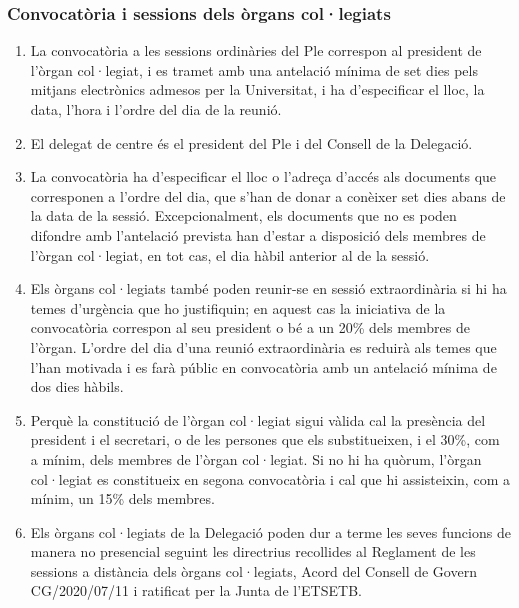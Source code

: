 \documentclass[a4paper,12pt]{article}
\renewcommand*{\thesubsubsection}{\arabic{subsubsection}}
\begin{document}
\subsubsection{Convocatòria i sessions dels òrgans col·legiats}\label{art:convocatories}
\begin{enumerate}[\thesubsubsection.1]
	\item La convocatòria a les sessions ordinàries del Ple correspon al president de l'òrgan col·legiat, i es tramet amb una antelació mínima de set dies pels mitjans electrònics admesos per la Universitat, i ha d'especificar el lloc, la data, l'hora i l'ordre del dia de la reunió.
	\item El delegat de centre és el president del Ple i del Consell de la Delegació.
	\item La convocatòria ha d'especificar el lloc o l'adreça d'accés als documents que corresponen a l'ordre del dia, que s'han de donar a conèixer set dies abans de la data de la sessió. Excepcionalment, els documents que no es poden difondre amb l'antelació prevista han d'estar a disposició dels membres de l'òrgan col·legiat, en tot cas, el dia hàbil anterior al de la sessió.
	\item Els òrgans col·legiats també poden reunir-se en sessió extraordinària si hi ha temes d'urgència que ho justifiquin; en aquest cas la iniciativa de la convocatòria correspon al seu president o bé a un 20\% dels membres de l'òrgan.\label{art:extraordinaries}
	L'ordre del dia d'una reunió extraordinària es reduirà als temes que l'han motivada i es farà públic en convocatòria amb un antelació mínima de dos dies hàbils.
	\item Perquè la constitució de l'òrgan col·legiat sigui vàlida cal la presència del president i el secretari, o de les persones que els substitueixen, i el 30\%, com a mínim, dels membres de l'òrgan col·legiat. Si no hi ha quòrum, l'òrgan col·legiat es constitueix en segona convocatòria i cal que hi assisteixin, com a mínim, un 15\% dels membres.\label{art:constitucio}
	\item Els òrgans col·legiats de la Delegació poden dur a terme les seves funcions de manera no presencial seguint les directrius recollides al Reglament de les sessions a distància dels òrgans col·legiats, Acord del Consell de Govern CG/2020/07/11 i ratificat per la Junta de l'ETSETB.
\end{enumerate}
\end{document}
